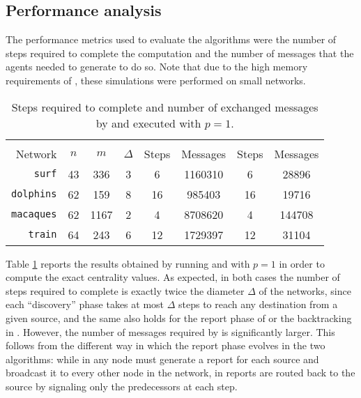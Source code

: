 \subsection{Performance analysis}

The performance metrics used to evaluate the algorithms were the number of steps required to complete the computation and the number of messages that the agents needed to generate to do so. Note that due to the high memory requirements of \deccen{}, these simulations were performed on small networks.

\begin{table}
\centering

\begin{tabular}{r c c c c c c c}
\toprule
 & & & & \multicolumn{2}{c}{\deccen{}} & \multicolumn{2}{c}{\multibfs{}} \\ \cmidrule(lr){5-6} \cmidrule(lr){7-8} 

Network           & $n$ & $m$  & $\Delta$ & Steps  & Messages & Steps & Messages \\ \midrule

\texttt{surf}     & 43  & 336  & 3        & 6      & 1160310  & 6     & 28896 \\
\texttt{dolphins} & 62  & 159  & 8        & 16     & 985403   & 16    & 19716 \\
\texttt{macaques}  & 62  & 1167 & 2        & 4      & 8708620  & 4     & 144708 \\
\texttt{train}    & 64  & 243  & 6        & 12     & 1729397  & 12    & 31104 \\
 
\bottomrule

\end{tabular}

\caption{Steps required to complete and number of exchanged messages by \deccen{} and \multibfs{} executed with $p=1$.}

\label{table:comparison}

\end{table}

Table \ref{table:comparison} reports the results obtained by running \deccen{} and \multibfs{} with $p = 1$ in order to compute the exact centrality values. As expected, in both cases the number of steps required to complete is exactly twice the diameter $\Delta$ of the networks, since each ``discovery'' phase takes at most $\Delta$ steps to reach any destination from a given source, and the same also holds for the report phase of \deccen{} or the backtracking in \multibfs{}. However, the number of messages required by \deccen{} is significantly larger. This follows from the different way in which the report phase evolves in the two algorithms: while in \deccen{} any node must generate a report for each source and broadcast it to every other node in the network, in \multibfs{} reports are routed back to the source by signaling only the predecessors at each step.




